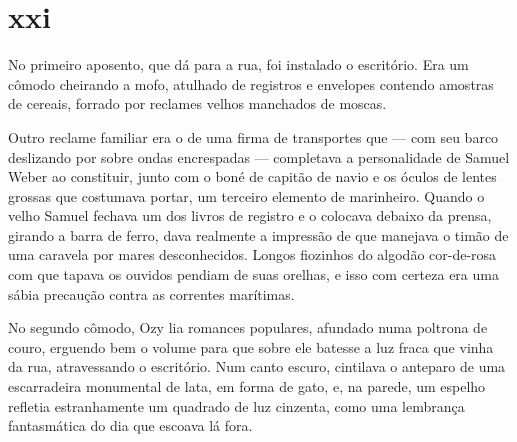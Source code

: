 

\section{xxi} 


No primeiro aposento, que dá para a rua, foi instalado o escritório. Era um
cômodo cheirando a mofo, atulhado de registros e envelopes contendo amostras
de cereais, forrado por reclames velhos manchados de moscas.


Outro reclame familiar era o de uma firma de transportes que --- com seu barco
deslizando por sobre ondas encrespadas --- completava a personalidade de
Samuel Weber ao constituir, junto com o boné de capitão de navio e os óculos
de lentes grossas que costumava portar, um terceiro elemento de marinheiro.
Quando o velho Samuel fechava um dos livros de registro e o colocava debaixo
da prensa, girando a barra de ferro, dava realmente a impressão de que
manejava o timão de uma caravela por mares desconhecidos. Longos fiozinhos do
algodão cor-de-rosa com que tapava os ouvidos pendiam de suas orelhas, e isso
com certeza era uma sábia precaução contra as correntes marítimas.

No segundo cômodo, Ozy lia romances populares, afundado numa poltrona de
couro, erguendo bem o volume para que sobre ele batesse a luz fraca que vinha
da rua, atravessando o escritório. Num canto escuro, cintilava o anteparo de
uma escarradeira monumental de lata, em forma de gato, e, na parede, um
espelho refletia estranhamente um quadrado de luz cinzenta, como uma
lembrança fantasmática do dia que escoava lá fora.

